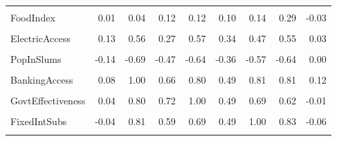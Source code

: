 \documentclass[
]{article}
\begin{document}
\begin{table}
{\begin{tabular}[t]{lrrrrrrrr}
\cellcolor{gray!10}{GiniCoeff} & \cellcolor{gray!10}{-0.08} & \cellcolor{gray!10}{-0.72} & \cellcolor{gray!10}{-0.47} & \cellcolor{gray!10}{-0.74} & \cellcolor{gray!10}{-0.38} & \cellcolor{gray!10}{-0.80} & \cellcolor{gray!10}{-0.82} & \cellcolor{gray!10}{-0.06}\\
FoodIndex & 0.01 & 0.04 & 0.12 & 0.12 & 0.10 & 0.14 & 0.29 & -0.03\\
\cellcolor{gray!10}{CorruptionScore} & \cellcolor{gray!10}{0.04} & \cellcolor{gray!10}{0.75} & \cellcolor{gray!10}{0.69} & \cellcolor{gray!10}{0.92} & \cellcolor{gray!10}{0.35} & \cellcolor{gray!10}{0.64} & \cellcolor{gray!10}{0.56} & \cellcolor{gray!10}{-0.03}\\
\addlinespace
ElectricAccess & 0.13 & 0.56 & 0.27 & 0.57 & 0.34 & 0.47 & 0.55 & 0.03\\
\cellcolor{gray!10}{PopDensity} & \cellcolor{gray!10}{0.05} & \cellcolor{gray!10}{0.18} & \cellcolor{gray!10}{0.07} & \cellcolor{gray!10}{0.22} & \cellcolor{gray!10}{0.34} & \cellcolor{gray!10}{0.24} & \cellcolor{gray!10}{0.15} & \cellcolor{gray!10}{0.01}\\
PopInSlums & -0.14 & -0.69 & -0.47 & -0.64 & -0.36 & -0.57 & -0.64 & 0.00\\
\cellcolor{gray!10}{WaterStress} & \cellcolor{gray!10}{1.00} & \cellcolor{gray!10}{0.08} & \cellcolor{gray!10}{-0.08} & \cellcolor{gray!10}{0.04} & \cellcolor{gray!10}{0.05} & \cellcolor{gray!10}{-0.04} & \cellcolor{gray!10}{0.10} & \cellcolor{gray!10}{-0.07}\\
BankingAccess & 0.08 & 1.00 & 0.66 & 0.80 & 0.49 & 0.81 & 0.81 & 0.12\\
\addlinespace
\cellcolor{gray!10}{RnDInvest} & \cellcolor{gray!10}{-0.08} & \cellcolor{gray!10}{0.66} & \cellcolor{gray!10}{1.00} & \cellcolor{gray!10}{0.72} & \cellcolor{gray!10}{0.46} & \cellcolor{gray!10}{0.59} & \cellcolor{gray!10}{0.49} & \cellcolor{gray!10}{-0.12}\\
GovtEffectiveness & 0.04 & 0.80 & 0.72 & 1.00 & 0.49 & 0.69 & 0.62 & -0.01\\
\cellcolor{gray!10}{ShippingIndex} & \cellcolor{gray!10}{0.05} & \cellcolor{gray!10}{0.49} & \cellcolor{gray!10}{0.46} & \cellcolor{gray!10}{0.49} & \cellcolor{gray!10}{1.00} & \cellcolor{gray!10}{0.49} & \cellcolor{gray!10}{0.46} & \cellcolor{gray!10}{0.03}\\
FixedIntSubs & -0.04 & 0.81 & 0.59 & 0.69 & 0.49 & 1.00 & 0.83 & -0.06\\
\cellcolor{gray!10}{InternetUsersPct} & \cellcolor{gray!10}{0.10} & \cellcolor{gray!10}{0.81} & \cellcolor{gray!10}{0.49} & \cellcolor{gray!10}{0.62} & \cellcolor{gray!10}{0.46} & \cellcolor{gray!10}{0.83} & \cellcolor{gray!10}{1.00} & \cellcolor{gray!10}{-0.08}\\

\end{tabular}}
\end{table}
\end{document}
